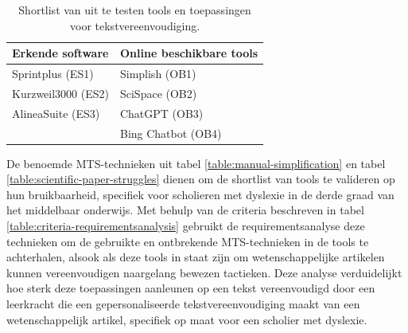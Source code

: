 \begin{center}
	\begin{table}[H]
		\begin{tabular}{ | m{6cm} | m{6cm} | } 
			\hline
			\textbf{Erkende software} & Online beschikbare tools \\
			\hline
			Sprintplus (ES1) & Simplish (OB1) \\
			Kurzweil3000 (ES2) & SciSpace (OB2) \\ 
			AlineaSuite	(ES3) & ChatGPT (OB3) \\
			& Bing Chatbot (OB4)\\
			\hline
		\end{tabular}
	\label{table:shortlist-tools}	
	\caption{Shortlist van uit te testen tools en toepassingen voor tekstvereenvoudiging.}
	\end{table}
\end{center}

De benoemde MTS-technieken uit tabel \ref{table:manual-simplification} en tabel \ref{table:scientific-paper-struggles} dienen om de shortlist van tools te valideren op hun bruikbaarheid, specifiek voor scholieren met dyslexie in de derde graad van het middelbaar onderwijs. Met behulp van de criteria beschreven in tabel \ref{table:criteria-requirementsanalysis} gebruikt de requirementsanalyse deze technieken om de gebruikte en ontbrekende MTS-technieken in de tools te achterhalen,  alsook als deze tools in staat zijn om wetenschappelijke artikelen kunnen vereenvoudigen naargelang bewezen tactieken. Deze analyse verduidelijkt hoe sterk deze toepassingen aanleunen op een tekst vereenvoudigd door een leerkracht die een gepersonaliseerde tekstvereenvoudiging maakt van een wetenschappelijk artikel, specifiek op maat voor een scholier met dyslexie.

